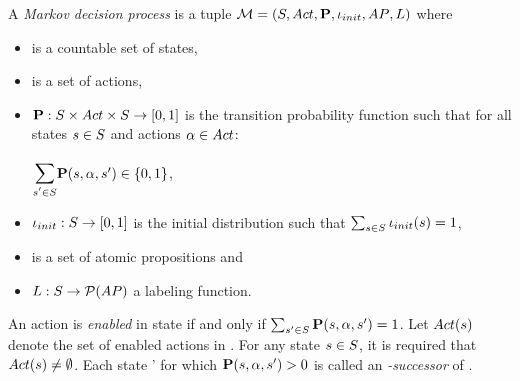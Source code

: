 \documentclass[preview]{standalone}
\begin{document}


\begin{definition}
	A \emph{Markov decision process} is a tuple ${{\mathcal{M}}} = {({S}, {Act}, {\textbf{P}}, {\iota_{init}}, {AP}, {L})}$ where
	\begin{itemize}
		\item \states is a countable set of states,
		\item \actions is a set of actions,
		\item ${\textbf{P}} : {S} \times {Act} \times {S} \to [0,1]$ is the transition probability function such that for all states ${s} \in {S}$ and actions ${\alpha} \in {Act}$:
		\begin{center}
			$\bbigsum{\state' \in \states}\probtfunc(\state,\action,\state') \in \{0,1\}$,
		\end{center}
		\item ${\iota_{init}} : {S} \to [0,1]$ is the initial distribution such that $\sum_{{s} \in {S}} {\iota_{init}}({s}) = 1$,
		\item \atomicprops is  a set of atomic propositions and
		\item ${L} : {S} \to {\mathcal{P}(\ensuremath{{AP}})}$ a labeling function.
	\end{itemize}
	An action \action is \emph{enabled} in state \state if and only if $\sum_{{s}' \in {S}} {\textbf{P}}({s},{\alpha},{s}') = 1$. Let ${Act}({s})$ denote the set of enabled actions in \state. For any state ${s} \in {S}$, it is required that ${Act}({s}) \neq \emptyset$. Each state \state' for which ${\textbf{P}}({s},{\alpha},{s}') > 0$ is called an \emph{\action-successor} of \state.
\end{definition}
\end{document}
